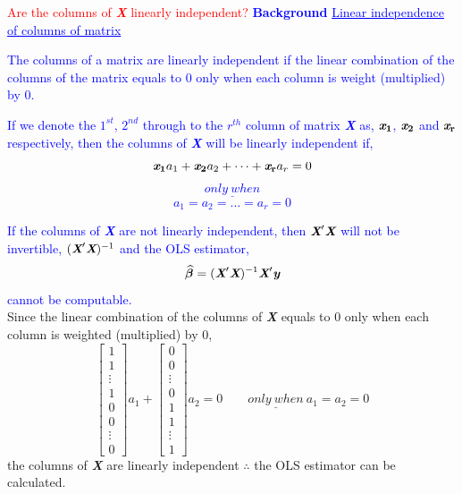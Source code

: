\documentclass[12pt]{report}
\newenvironment{blueframed}[1][blue]
{\def\FrameCommand{\fboxsep=\FrameSep\fcolorbox{#1}{white}}%
\MakeFramed {\advance\hsize-\width \FrameRestore}}
{\endMakeFramed}
\begin{document}
\noindent \textcolor{red}{Are the columns of \textit{\textbf{X}} linearly independent?}
\justify
\begin{blueframed}
	\textcolor{blue}{\textbf{Background}}
	\vspace{-\baselineskip}
	\justify
	\textcolor{blue}{\underline{Linear independence of columns of matrix}}
	
	\noindent \textcolor{blue}
	{
		The columns of a matrix are linearly independent if the linear combination of the columns of the matrix equals to 0 only when each column is weight (multiplied) by 0.
	}
	
	\noindent \textcolor{blue}
	{
		If we denote the $1^{st}$, $2^{nd}$ through to the $r^{th}$ column of matrix \textit{\textbf{X}} as, $\textit{\textbf{x}}_\textbf{1}$, $\textit{\textbf{x}}_\textbf{2}$ and $\textit{\textbf{x}}_\textbf{r}$ respectively, then the columns of \textit{\textbf{X}} will be linearly independent if,
		$$ 
		\textit{\textbf{x}}_\textbf{1}a_1 + \textit{\textbf{x}}_\textbf{2}a_2 + \dots + \textit{\textbf{x}}_\textbf{r}a_r = 0
		$$
		$$
		\underline{only\ when}
		$$
		$$
		a_1 = a_2 = \dots = a_r = 0
		$$
	}
	
	\noindent \textcolor{blue}
	{
		If the columns of \textit{\textbf{X}} are not linearly independent, then $\textit{\textbf{X}}'\textit{\textbf{X}}$ will not be invertible,
		\sout{$(\textit{\textbf{X}}'\textit{\textbf{X}})^{-1}$}
		and the OLS estimator,
		$$
		\widehat{\boldsymbol{\beta}} 
		= (\textit{\textbf{X}}'\textit{\textbf{X}})^{-1}\textit{\textbf{X}}'\textit{\textbf{y}}
		$$
		cannot be computable. \\
	}
\end{blueframed}
\noindent Since the linear combination of the columns of  \textit{\textbf{X}} equals to 0 only when each column is weighted (multiplied) by 0,
$$
\begin{bmatrix}
1 \\
1 \\
\vdots \\
1 \\
0 \\
0 \\
\vdots \\
0
\end{bmatrix}
a_1
+
\begin{bmatrix}
0 \\
0 \\
\vdots \\
0 \\
1 \\
1 \\
\vdots \\
1
\end{bmatrix}
a_2
=
0
\qquad
\underline{only\ when}\ a_1 = a_2 = 0
$$
\noindent the columns of \textit{\textbf{X}} are linearly independent $\therefore$ the OLS estimator can be calculated.
\end{document}
